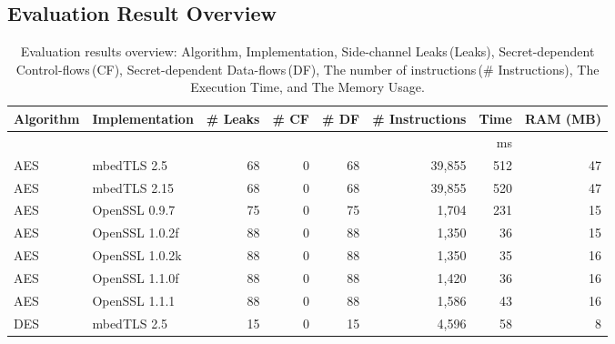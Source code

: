 \subsection{Evaluation Result Overview}
\begin{table}
  \centering\small\footnotesize
  \caption{Evaluation results overview: Algorithm, Implementation, Side-channel Leaks\,(Leaks),
    Secret-dependent Control-flows\,(CF), Secret-dependent Data-flows\,(DF),
    The number of instructions\,(\# Instructions), The Execution Time, and The Memory Usage.
  }\label{table:over_result}
  \begin{tabular}{llrrrrrr}
    \hline
    \textbf{Algorithm} & \textbf{Implementation}  & \textbf{\# Leaks} & \textbf{\# CF}    & \textbf{\# DF}
                       & \textbf{\# Instructions} & \textbf{Time}     & \textbf{RAM (MB)}                                                  \\\hline
                       &                          &                   &                   &                &             & ms              \\\cline{7-7}
    AES                & mbedTLS 2.5              & 68                & 0                 & 68             & 39,855      & 512     & 47    \\
    AES                & mbedTLS 2.15             & 68                & 0                 & 68             & 39,855      & 520     & 47    \\
    AES                & OpenSSL 0.9.7            & 75                & 0                 & 75             & 1,704       & 231     & 15    \\
    AES                & OpenSSL 1.0.2f           & 88                & 0                 & 88             & 1,350       & 36      & 15    \\
    AES                & OpenSSL 1.0.2k           & 88                & 0                 & 88             & 1,350       & 35      & 16    \\
    AES                & OpenSSL 1.1.0f           & 88                & 0                 & 88             & 1,420       & 36      & 16    \\
    AES                & OpenSSL 1.1.1            & 88                & 0                 & 88             & 1,586       & 43      & 16    \\
    DES                & mbedTLS 2.5              & 15                & 0                 & 15             & 4,596       & 58      & 8     \\

\end{tabular}
\end{table}
